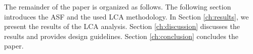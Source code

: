 The remainder of the paper is organized as follows. The following section introduces the ASF and the used LCA methodology. In Section \ref{ch:results}, we present the results of the LCA analysis. Section \ref{ch:discussion} discusses the results and provides design guidelines. Section \ref{ch:conclusion} concludes the paper.








